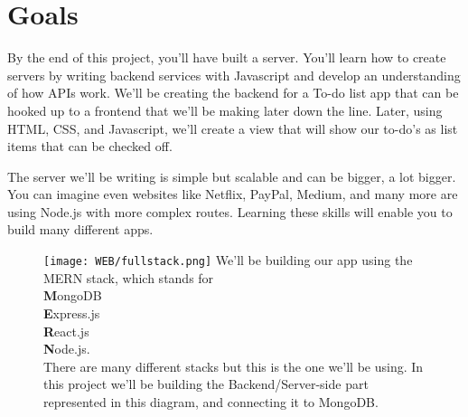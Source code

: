 \documentclass{42-en}
\begin{document}
\chapter{Goals}

    By the end of this project, you’ll have built a server. You’ll learn how to create servers by writing backend services with Javascript and develop an understanding of how APIs work. We’ll be creating the backend for a To-do list app that can be hooked up to a frontend that we’ll be making later down the line. Later, using HTML, CSS, and Javascript, we’ll create a view that will show our to-do’s as list items that can be checked off.

The server we’ll be writing is simple but scalable and can be bigger, a lot bigger. You can imagine even websites like Netflix, PayPal, Medium, and many more are using Node.js with more complex routes. Learning these skills will enable you to build many different apps.



    \begin{figure}[H]
        \texttt{[image: WEB/fullstack.png]}
        We'll be building our app using the MERN stack, which stands for \\
        \textbf{M}ongoDB \\
        \textbf{E}xpress.js \\
        \textbf{R}eact.js \\
        \textbf{N}ode.js. \\
        There are many different stacks but this is the one we'll be using.
        In this project we’ll be building the Backend/Server-side part represented in this diagram, and connecting it to MongoDB.
    \end{figure}


\end{document}
